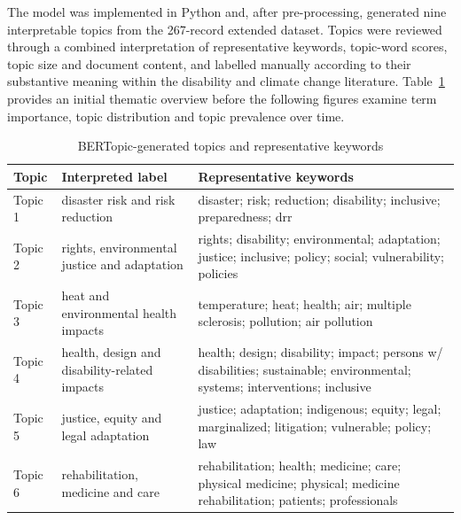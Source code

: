 \documentclass[12pt,a4paper]{report}
\begin{document}
The model was implemented in Python and, after pre-processing, generated nine interpretable topics from the 267-record extended dataset. Topics were reviewed through a combined interpretation of representative keywords, topic-word scores, topic size and document content, and labelled manually according to their substantive meaning within the disability and climate change literature. Table~\ref{tab:bertopic_topics} provides an initial thematic overview before the following figures examine term importance, topic distribution and topic prevalence over time.

\begin{table}[H]
\centering
\small
\renewcommand{\arraystretch}{1.3}
\caption{BERTopic-generated topics and representative keywords}
\label{tab:bertopic_topics}

\begin{tabularx}{\textwidth}{
>{\raggedright\arraybackslash}p{}
>{\raggedright\arraybackslash}X
>{\raggedright\arraybackslash}X
}
\toprule
\textbf{Topic} & \textbf{Interpreted label} & \textbf{Representative keywords} \\
\midrule

Topic 1
& disaster risk and risk reduction
& disaster; risk; reduction; disability; inclusive; preparedness; drr \\

Topic 2
& rights, environmental justice and adaptation
& rights; disability; environmental; adaptation; justice; inclusive; policy; social; vulnerability; policies \\

Topic 3
& heat and environmental health impacts
& temperature; heat; health; air; multiple sclerosis; pollution; air pollution \\

Topic 4
& health, design and disability-related impacts
& health; design; disability; impact; persons w/ disabilities; sustainable; environmental; systems; interventions; inclusive \\

Topic 5
& justice, equity and legal adaptation
& justice; adaptation; indigenous; equity; legal; marginalized; litigation; vulnerable; policy; law \\

Topic 6
& rehabilitation, medicine and care
& rehabilitation; health; medicine; care; physical medicine; physical; medicine rehabilitation; patients; professionals \\


\end{tabularx}
\end{table}
\end{document}
